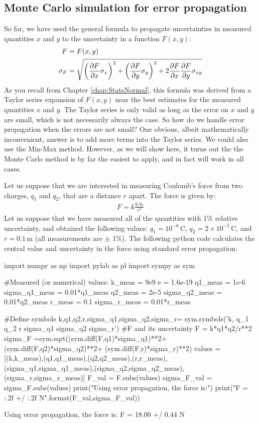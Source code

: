 \subsection{Monte Carlo simulation for error propagation}
So far, we have used the general formula to propagate uncertainties in measured quantities $x$ and $y$ to the uncertainty in a function $F(x,y)$:
\begin{align}
F&=F(x,y)\nonumber\\
\sigma_{F} &= \sqrt{\left(\frac{\partial F}{\partial x}\sigma_x\right)^2 + \left(\frac{\partial F}{\partial y} \sigma_y\right)^2+2\frac{\partial F}{\partial x}\frac{\partial F}{\partial y}\sigma_{xy}}
\end{align}
As you recall from Chapter \ref{chap:StatsNormal}, this formula was derived from a Taylor series expansion of $F(x,y)$ near the best estimates for the measured quantities $x$ and $y$. The Taylor series is only valid as long as the error on $x$ and $y$ are small, which is not necessarily always the case. So how do we handle error propagation when the errors are not small? One obvious, albeit mathematically inconvenient, answer is to add more terms into the Taylor series. We could also use the Min-Max method. However, as we will show here, it turns out the the Monte Carlo method is by far the easiest to apply, and in fact will work in all cases.

Let us suppose that we are interested in measuring Coulomb's force from two charges, $q_1$ and $q_2$, that are a distance $r$ apart. The force is given by:
\begin{align*}
F = k\frac{q_1q_2}{r^2}
\end{align*}
Let us suppose that we have measured all of the quantities with 1\% relative uncertainty, and obtained the following values: $q_1 =10^{-6}$\,C, $q_2 =2\times10^{-5}$\,C, and $r=0.1$\,m (all measurements are $\pm$ 1\%). The following python code calculates the central value and uncertainty in the force using standard error propagation:
\begin{python}[caption = Standard error propagation] 
import numpy as np
import pylab as pl
import sympy as sym

#Measured (or numerical) values:
k_meas = 9e9
e = 1.6e-19
q1_meas = 1e-6
sigma_q1_meas = 0.01*q1_meas
q2_meas = 2e-5
sigma_q2_meas = 0.01*q2_meas
r_meas = 0.1
sigma_r_meas = 0.01*r_meas

#Define symbols
k,q1,q2,r,sigma_q1,sigma_q2,sigma_r= sym.symbols('k, q_1 q_2 r sigma_{q1} sigma_{q2} sigma_{r}')
#F and its uncertainty
F = k*q1*q2/r**2
sigma_F =sym.sqrt((sym.diff(F,q1)*sigma_q1)**2+ (sym.diff(F,q2)*sigma_q2)**2+ (sym.diff(F,r)*sigma_r)**2)
values = [(k,k_meas),(q1,q1_meas),(q2,q2_meas),(r,r_meas),
          (sigma_q1,sigma_q1_meas),(sigma_q2,sigma_q2_meas),(sigma_r,sigma_r_meas)]
F_val = F.subs(values)
sigma_F_val = sigma_F.subs(values)
print("Using error propagation, the force is:")
print("F = {:.2f} +/ {:.2f} N".format(F_val,sigma_F_val))

\end{python}
\begin{poutput}
Using error propagation, the force is:
F = 18.00 +/ 0.44 N
\end{poutput}

